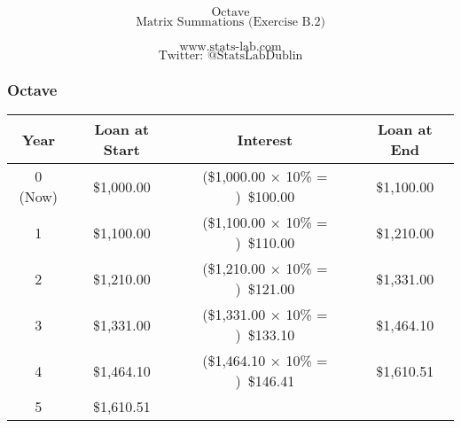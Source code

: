 \documentclass{beamer}
\begin{document}
\begin{frame}
\bigskip
{
\Huge
\[ \mbox{Octave}  \]
}
{
\huge
\[ \mbox{Matrix Summations (Exercise B.2)}  \]
}

{
\LARGE
\[ \mbox{www.stats-lab.com}  \]
\[ \mbox{Twitter: @StatsLabDublin} \]
}
\end{frame}

\begin{frame}
\frametitle{Octave}
{
\Large
\begin{tabular}{|c|c|c|c|}
Year	&	Loan at Start	&	Interest	&	Loan at End	\\	\hline
0 (Now)	&	\$1,000.00	&	(\$1,000.00 × 10\% = ) \$100.00	&	\$1,100.00	\\	\hline
1	&	\$1,100.00	&	(\$1,100.00 × 10\% = ) \$110.00	&	\$1,210.00	\\	\hline
2	&	\$1,210.00	&	(\$1,210.00 × 10\% = ) \$121.00	&	\$1,331.00	\\	\hline
3	&	\$1,331.00	&	(\$1,331.00 × 10\% = ) \$133.10	&	\$1,464.10	\\	\hline
4	&	\$1,464.10	&	(\$1,464.10 × 10\% = ) \$146.41	&	\$1,610.51	\\	\hline
5	&	\$1,610.51	&		&		\\	\hline
\end{tabular} 
}
\end{frame}
\end{document}
